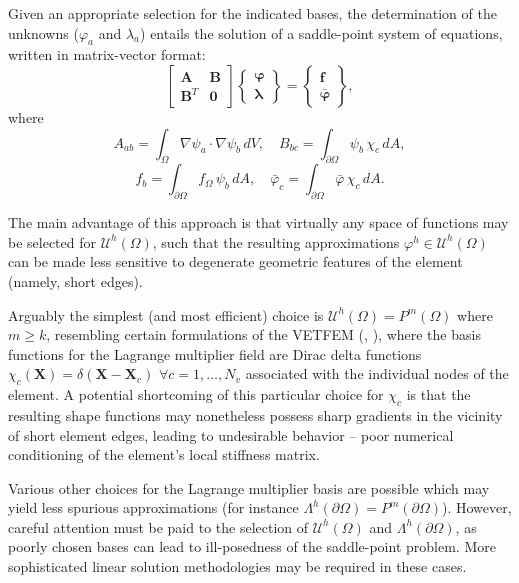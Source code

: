 Given an appropriate selection for the indicated bases, the determination of the unknowns ($\varphi_a$ and $\lambda_a$) entails the solution of a saddle-point system of equations, written in matrix-vector format:
\begin{equation}
	\left[ \begin{array}{cc} \mathbf{A} & \mathbf{B} \\ \mathbf{B}^T & \mathbf{0} \end{array} \right] \left\{ \begin{array}{c} \boldsymbol{\varphi} \\ \boldsymbol{\lambda} \end{array} \right\} = \left\{ \begin{array}{c} \mathbf{f} \\ \bar{\boldsymbol{\varphi}} \end{array} \right\},
\end{equation}
where
\begin{equation}
	A_{ab} = \int_{\Omega} \nabla \psi_a \cdot \nabla \psi_b \, dV, \quad B_{bc} = \int_{\partial \Omega} \psi_b \, \chi_c \, dA,
\end{equation}
\begin{equation}
	f_{b} = \int_{\partial \Omega} f_\Omega \, \psi_b \, dA, \quad \bar{\varphi}_{c} = \int_{\partial \Omega} \bar{\varphi} \, \chi_c \, dA.
\end{equation}

	The main advantage of this approach is that virtually any space of functions may be selected for $\mathcal{U}^h (\Omega)$, such that the resulting approximations $\varphi^h \in \mathcal{U}^h (\Omega)$ can be made less sensitive to degenerate geometric features of the element (namely, short edges).
	
	Arguably the simplest (and most efficient) choice is $\mathcal{U}^h (\Omega) = P^{m} (\Omega)$ where $m \geq k$, resembling certain formulations of the VETFEM (\cite{Rashid:00}, \cite{Rashid:06}), where the basis functions for the Lagrange multiplier field are Dirac delta functions $\chi_c (\mathbf{X}) = \delta (\mathbf{X} - \mathbf{X}_c) \, \, \forall c = 1, \ldots, N_v$ associated with the individual nodes of the element. A potential shortcoming of this particular choice for $\chi_c$ is that the resulting shape functions may nonetheless possess sharp gradients in the vicinity of short element edges, leading to undesirable behavior -- poor numerical conditioning of the element's local stiffness matrix.
	
	Various other choices for the Lagrange multiplier basis are possible which may yield less spurious approximations (for instance $\Lambda^h (\partial \Omega) = P^{m} (\partial \Omega)$). However, careful attention must be paid to the selection of $\mathcal{U}^h (\Omega)$ and $\Lambda^h (\partial \Omega)$, as poorly chosen bases can lead to ill-posedness of the saddle-point problem. More sophisticated linear solution methodologies may be required in these cases.

